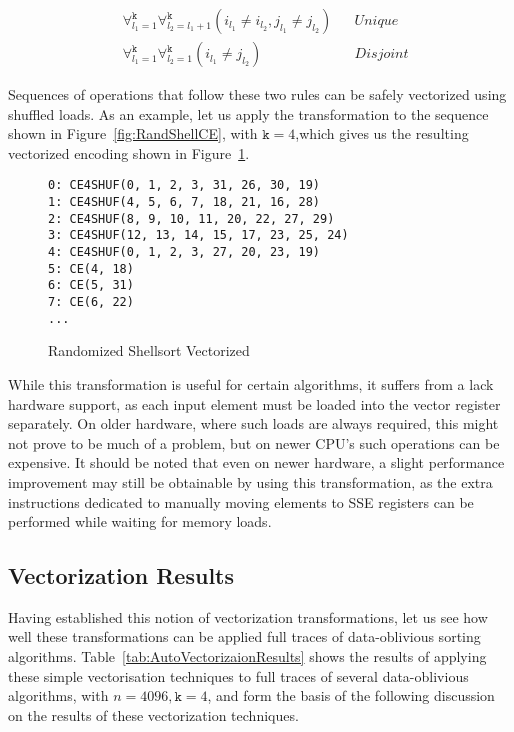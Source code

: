 \[
\begin{aligned}
&\forall_{l_1=1}^{\mathtt{k}} \forall_{l_2=l_1+1}^{\mathtt{k}} (i_{l_1} \neq i_{l_2}, j_{l_1} \neq j_{l_2})  && Unique\\
&\forall_{l_1=1}^{\mathtt{k}} \forall_{l_2=1}^{\mathtt{k}} (i_{l_1} \neq j_{l_2})  && Disjoint
\end{aligned}
\]

Sequences of operations that follow these two rules can be safely vectorized using shuffled loads. As an example, let us apply the transformation to the sequence shown in Figure~\ref{fig:RandShellCE}, with $\mathtt{k} =4$,which gives us the resulting vectorized encoding shown in Figure~\ref{fig:RandShellCESHUF}.

\begin{figure}
\begin{verbatim}
0: CE4SHUF(0, 1, 2, 3, 31, 26, 30, 19)
1: CE4SHUF(4, 5, 6, 7, 18, 21, 16, 28)
2: CE4SHUF(8, 9, 10, 11, 20, 22, 27, 29)
3: CE4SHUF(12, 13, 14, 15, 17, 23, 25, 24)
4: CE4SHUF(0, 1, 2, 3, 27, 20, 23, 19)
5: CE(4, 18)
6: CE(5, 31)
7: CE(6, 22)
...
\end{verbatim}
\caption{Randomized Shellsort Vectorized}
\label{fig:RandShellCESHUF}
\end{figure}

While this transformation is useful for certain algorithms, it suffers from a lack hardware support, as each input element must be loaded into the vector register separately. On older hardware, where such loads are always required, this might not prove to be much of a problem, but on newer CPU's such operations can be expensive. It should be noted that even on newer hardware, a slight performance improvement may still be obtainable by using this transformation, as the extra instructions dedicated to manually moving elements to SSE registers can be performed while waiting for memory loads.

\subsection{Vectorization Results}

Having established this notion of vectorization transformations, let us see how well these transformations can be applied full traces of data-oblivious sorting algorithms. 
Table~\ref{tab:AutoVectorizaionResults} shows the results of applying these simple vectorisation techniques to full traces of several data-oblivious algorithms, with $n = 4096, \mathtt{k} = 4$, and form the basis of the following discussion on the results of these vectorization techniques.

